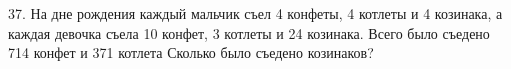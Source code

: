 37. На дне рождения каждый мальчик съел 4 конфеты, 4 котлеты и 4 козинака, а каждая девочка съела 10 конфет, 3 котлеты и 24 козинака. Всего было съедено 714 конфет и 371 котлета Сколько было съедено козинаков?\\
